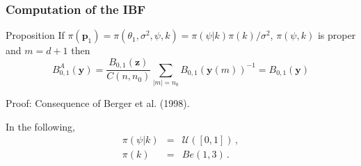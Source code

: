 \documentclass[nopagenumber,9pt]{beamer}
\newcommand{\bs}{\boldsymbol}
\begin{document}
\begin{frame}
 \frametitle{Computation of the IBF}
 
 \begin{beamerboxesrounded}{Proposition}
  If $\pi(\bs p_1)=\pi(\theta_1,\sigma^2,\psi,k)=\pi(\psi|k)\pi(k)/\sigma^2$, $\pi(\psi,k)$ is proper and $m=d+1$ then
  $$B_{0,1}^A(\bs y)=\frac{B_{0,1}(\bs z)}{C(n,n_0)} \sum_{|m|=n_0} B_{0,1}(\bs y(m))^{-1}=B_{0,1}(\bs y)$$
 \end{beamerboxesrounded}

 \bigskip
 
 Proof: Consequence of \color{blue}Berger et al. (1998)\color{black}.
 
 \bigskip
 
 In the following, 
 \begin{eqnarray*}
  \pi(\psi|k)&=& \mathcal{U}([0,1])\,, \\
  \pi(k)&=&Be(1,3)\,.
 \end{eqnarray*}

 
 
\end{frame}
\end{document}
